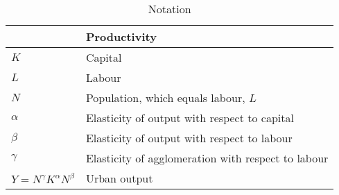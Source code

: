\begin{longtable}{lp{10cm}}
\caption{Notation}                       \\

\hline           &  \textbf{Productivity} \\ \hline
$K$              &  Capital               \\ 
$L$              &  Labour                \\
$N$              &  Population, which equals labour, $L$                  \\ 
$\alpha$         &  Elasticity of output with respect to capital          \\
$\beta$          &  Elasticity of output with respect to labour           \\ %
$\gamma$         &  Elasticity of agglomeration with respect to labour    \\ %
$Y=N^\gamma K^{\alpha }N^{\beta }$  &  Urban output                       \\


\end{longtable}
